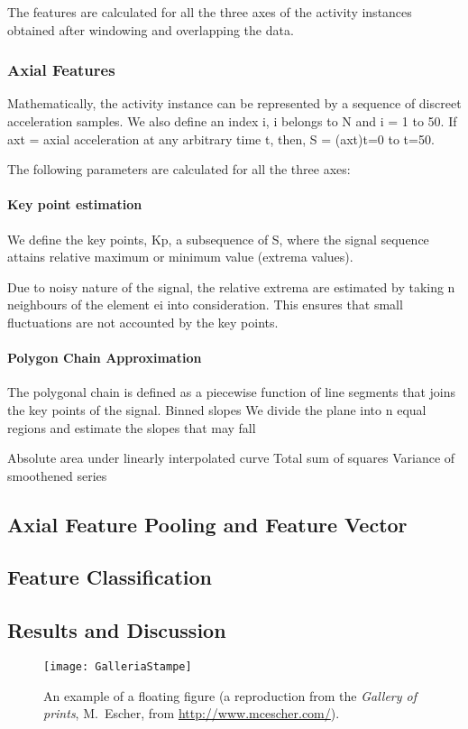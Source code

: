 \documentclass[
10pt, %
a4paper, %
oneside, %
headinclude,footinclude, %
BCOR5mm, %
]{scrartcl}
\begin{document}
The features are calculated for all the three axes of the activity instances obtained after windowing and overlapping the data.

\subsubsection{Axial Features}
Mathematically, the activity instance can be represented by a sequence of discreet acceleration samples. We also define an index i, i belongs to N and i = 1 to 50. If axt = axial acceleration at any arbitrary time t, then, S = (axt)t=0 to t=50.

The following parameters are calculated for all the three axes:
\paragraph{Key point estimation}
We define the key points, Kp, a subsequence of S, where the signal sequence attains relative maximum or minimum value (extrema values).

Due to noisy nature of the signal, the relative extrema are estimated by taking n neighbours of the element ei into consideration. This ensures that small fluctuations are not accounted by the key points.
\paragraph{Polygon Chain Approximation}
The polygonal chain is defined as a piecewise function of line segments that joins the key points of the signal. 
Binned slopes
We divide the plane into n equal regions and estimate the slopes that may fall 

Absolute area under linearly interpolated curve
Total sum of squares
Variance of smoothened series

\subsection{Axial Feature Pooling and Feature Vector}
\subsection{Feature Classification}
\subsection{Results and Discussion}

\begin{figure}[tb]
\centering
\texttt{[image: GalleriaStampe]}
\caption[An example of a floating figure]{An example of a floating figure (a reproduction from the \emph{Gallery of prints}, M.~Escher, from \url{http://www.mcescher.com/}).} %
\label{fig:gallery}
\end{figure}
\end{document}
